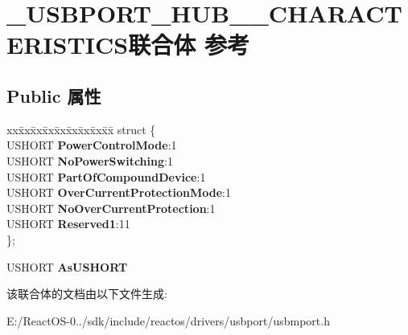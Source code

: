 \hypertarget{union___u_s_b_p_o_r_t___h_u_b__11___c_h_a_r_a_c_t_e_r_i_s_t_i_c_s}{}\section{\+\_\+\+U\+S\+B\+P\+O\+R\+T\+\_\+\+H\+U\+B\+\_\+\_\+\+C\+H\+A\+R\+A\+C\+T\+E\+R\+I\+S\+T\+I\+C\+S联合体 参考}
\label{union___u_s_b_p_o_r_t___h_u_b__11___c_h_a_r_a_c_t_e_r_i_s_t_i_c_s}
\subsection*{Public 属性}
\begin{DoxyCompactItemize}
\item 
\mbox{\label{union___u_s_b_p_o_r_t___h_u_b__11___c_h_a_r_a_c_t_e_r_i_s_t_i_c_s_a30094f1df25fe63dcba1439362abfa9f}} 
\begin{tabbing}
xx\=xx\=xx\=xx\=xx\=xx\=xx\=xx\=xx\=\kill
struct \{\\
\>USHORT {\bfseries PowerControlMode}:1\\
\>USHORT {\bfseries NoPowerSwitching}:1\\
\>USHORT {\bfseries PartOfCompoundDevice}:1\\
\>USHORT {\bfseries OverCurrentProtectionMode}:1\\
\>USHORT {\bfseries NoOverCurrentProtection}:1\\
\>USHORT {\bfseries Reserved1}:11\\
\}; \\

\end{tabbing}\item 
\mbox{\label{union___u_s_b_p_o_r_t___h_u_b__11___c_h_a_r_a_c_t_e_r_i_s_t_i_c_s_af045e64f92982f54727fda7005521c5d}} 
U\+S\+H\+O\+RT {\bfseries As\+U\+S\+H\+O\+RT}
\end{DoxyCompactItemize}


该联合体的文档由以下文件生成\+:\begin{DoxyCompactItemize}
\item 
E\+:/\+React\+O\+S-\/0../sdk/include/reactos/drivers/usbport/usbmport.\+h\end{DoxyCompactItemize}
